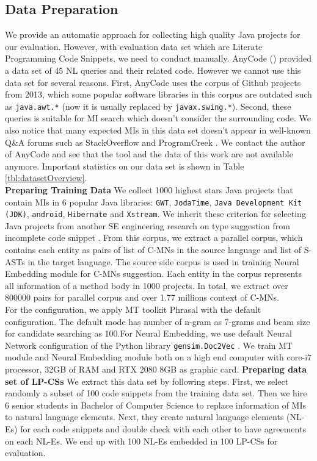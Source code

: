 \documentclass[sigconf,review,anonymous]{article}
\begin{document}
\subsection{Data Preparation}
We provide an automatic approach for collecting high quality Java projects for our evaluation. However, with evaluation data set which are Literate Programming Code Snippets, we need to conduct manually. AnyCode (\cite{007}) provided a data set of 45 NL queries and their related code. However we cannot use this data set for several reasons. First, AnyCode uses the corpus of Github projects from 2013, which some popular software libraries in this corpus are outdated such as \texttt{java.awt.*} (now it is usually replaced by \texttt{javax.swing.*}). Second, these queries is suitable for MI search which doesn't consider the surrounding code. We also notice that many expected MIs in this data set doesn't appear in well-known Q&A forums such as StackOverflow \cite{021} and ProgramCreek \cite{020}. We contact the author of AnyCode \cite{007} and see that the tool and the data of this work are not available anymore. Important statistics on our data set is shown in Table \ref{tbl:datasetOverview}.
\\

\textbf{Preparing Training Data} We collect 1000 highest stars Java projects that contain MIs in 6 popular Java libraries: \texttt{GWT}, \texttt{JodaTime}, \texttt{Java Development Kit (JDK)}, \texttt{android}, \texttt{Hibernate} and \texttt{Xstream}. We inherit these criterion for selecting Java projects from another SE engineering research on type suggestion from incomplete code snippet \cite{022}. From this corpus, we extract a parallel corpus, which contains each entity as pairs of list of C-MNs in the source language and list of S-ASTs in the target language. The source side corpus is used in training Neural Embedding module for C-MNs suggestion. Each entity in the corpus represents all information of a method body in 1000 projects. In total, we extract over 800000 pairs for parallel corpus and over 1.77 millions context of C-MNs.
\\
For the configuration, we apply MT toolkit Phrasal \cite{015} with the default configuration. The default mode has number of n-gram as 7-grams and beam size for candidate searching as 100.For Neural Embedding, we use default Neural Network configuration of the Python library \texttt{gensim.Doc2Vec} \cite{023}. We train MT module and Neural Embedding module both on a high end computer with core-i7 processor, 32GB of RAM and RTX 2080 8GB as graphic card.
\textbf{Preparing data set of LP-CSs} We extract this data set by following steps. First, we select randomly a subset of 100 code snippets from the training data set. Then we hire 6 senior students in Bachelor of Computer Science to replace information of MIs to natural language elements. Next, they create natural language elements (NL-Es) for each code snippets and double check with each other to have agreements on each NL-Es. We end up with 100 NL-Es embedded in 100 LP-CSs for evaluation.  
\end{document}
